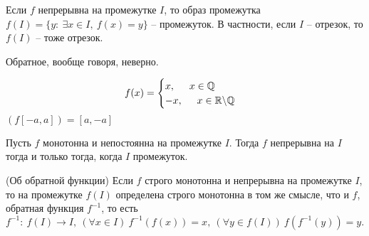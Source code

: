 \begin{multicols}{2}
\begin{lemma}{}{} Если $f$ непрерывна на промежутке $I$, то образ промежутка $f(I) = \{y:\ \exists x \in I,\ f(x) = y\}$ -- промежуток. В частности, если $I$ -- отрезок, то $f(I)$ -- тоже отрезок.
\end{lemma}
\begin{note}{}{}
     Обратное, вообще говоря, неверно.
\end{note}
\Ex 
\[
	f(x) = \begin{cases}
		x, \hspace{0.5cm} x\in\mathbb Q\\-x,\hspace{0.5cm} x \in\mathbb R\backslash \mathbb Q
	\end{cases}
\]
$(f[-a,a]) = [a, -a]$ 
\begin{lemma}{}{}
     Пусть $f$ монотонна и непостоянна на промежутке $I$. Тогда $f$ непрерывна на $I$ тогда и только тогда, когда $I$ промежуток.
\end{lemma}
\begin{theorema}{(Об обратной функции)}{}
    Если $f$ строго монотонна и непрерывна на промежутке $I$, то на промежутке $f(I)$ определена строго монотонна в  том же смысле, что и $f$, обратная функция $f^{-1}$, то есть $f^{-1}:\ f(I) \to I,\ (\forall x \in I)\ f^{-1}(f(x)) = x,\ (\forall y \in f(I))\ f(f^{-1}(y)) = y.$
\end{theorema}

\end{multicols}
